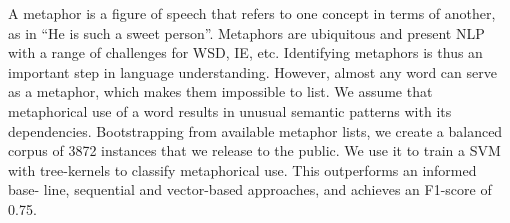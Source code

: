 A metaphor is a figure of speech that refers to one concept in terms of another, as in ``He is such a sweet person''. Metaphors are ubiquitous and
 present NLP with a range of challenges for WSD, IE, etc. Identifying metaphors
 is thus an important step in language understanding. However, almost any word
 can serve as a metaphor, which makes them impossible to list. We assume that
 metaphorical use of a word results in unusual semantic patterns with its
 dependencies. Bootstrapping from available metaphor lists, we create a balanced
 corpus of 3872 instances that we release to the public. We use it to train a
 SVM with tree-kernels to classify metaphorical use. This outperforms an
 informed base- line, sequential and vector-based approaches, and achieves an
 F1-score of 0.75.


